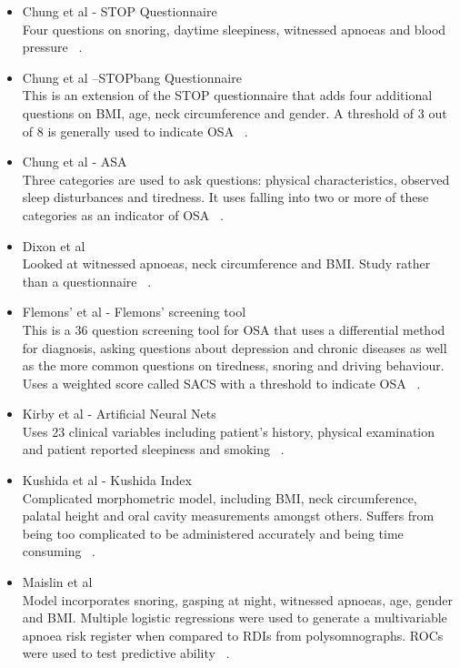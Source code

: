 \begin{itemize}
\item Chung et al - STOP Questionnaire \\
Four questions on snoring, daytime sleepiness, witnessed apnoeas and blood pressure ~\cite{chung2008stop}.
\item Chung et al –STOPbang Questionnaire \\
This is an extension of the STOP questionnaire that adds four additional questions on BMI, age, neck circumference and gender. A threshold of 3 out of 8 is generally used to indicate OSA ~\cite{chung2012high}.
\item Chung et al - ASA \\
Three categories are used to ask questions: physical characteristics, observed sleep disturbances and tiredness. It uses falling into two or more of these categories as an indicator of OSA ~\cite{chung2008validation}.
\item Dixon et al \\
Looked at witnessed apnoeas, neck circumference and BMI. Study rather than a questionnaire ~\cite{dixon2003predicting}.
\item Flemons’ et al - Flemons’ screening tool \\
This is a 36 question screening tool for OSA that uses a differential method for diagnosis, asking questions about depression and chronic diseases as well as the more common questions on tiredness, snoring and driving behaviour. Uses a weighted score called SACS with a threshold to indicate OSA ~\cite{flemons1994likelihood}.
\item Kirby et al - Artificial Neural Nets \\
Uses 23 clinical variables including patient’s history, physical examination and patient reported sleepiness and smoking ~\cite{kirby1999neural}.
\item Kushida et al - Kushida Index \\
Complicated morphometric model, including BMI, neck circumference, palatal height and oral cavity measurements amongst others. Suffers from being too complicated to be administered accurately and being time consuming ~\cite{kushida1997predictive}.
\item Maislin et al \\
Model incorporates snoring, gasping at night, witnessed apnoeas, age, gender and BMI. Multiple logistic regressions were used to generate a multivariable apnoea risk register when compared to RDIs from polysomnographs. ROCs were used to test predictive ability ~\cite{dinges1995survey}.

\end{itemize}
